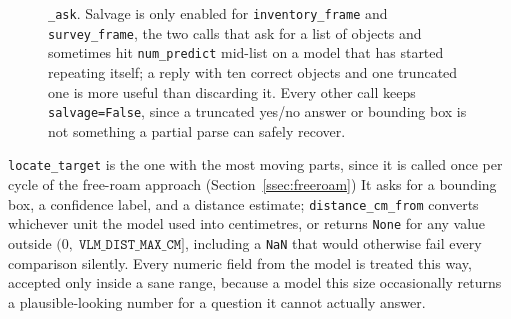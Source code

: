 \begin{figure}[htbp]
  \centering
  \caption{\texttt{\_ask}. Salvage is only enabled for \texttt{inventory\_frame} and \texttt{survey\_frame}, the two calls that ask for a list of objects and sometimes hit \texttt{num\_predict} mid-list on a model that has started repeating itself; a reply with ten correct objects and one truncated one is more useful than discarding it. Every other call keeps \texttt{salvage=False}, since a truncated yes/no answer or bounding box is not something a partial parse can safely recover.}
  \label{fig:flow-vlm}
\end{figure}

\texttt{locate\_target} is the one with the most moving parts, since it is
called once per cycle of the free-roam approach (Section~\ref{ssec:freeroam})
It asks for a bounding box, a confidence label, and a distance estimate;
\texttt{distance\_cm\_from} converts whichever unit the model used into
centimetres, or returns \texttt{None} for any value outside
\((0,\;\texttt{VLM\_DIST\_MAX\_CM}]\), including a \texttt{NaN} that would
otherwise fail every comparison silently. Every numeric field from the model
is treated this way, accepted only inside a sane range, because a model this
size occasionally returns a plausible-looking number for a question it
cannot actually answer.

